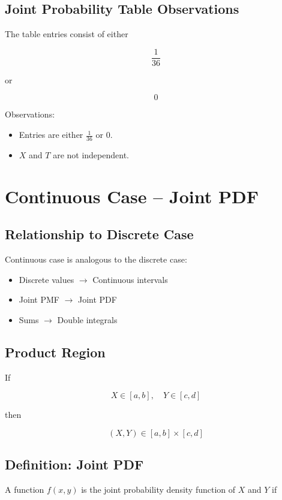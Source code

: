 \documentclass[12pt]{article}
\begin{document}
\subsection{Joint Probability Table Observations}

The table entries consist of either

\[
\frac{1}{36}
\]

or

\[
0
\]

Observations:

\begin{itemize}
\item Entries are either $\frac{1}{36}$ or $0$.
\item $X$ and $T$ are not independent.
\end{itemize}

\section{Continuous Case -- Joint PDF}

\subsection{Relationship to Discrete Case}

Continuous case is analogous to the discrete case:

\begin{itemize}
\item Discrete values $\rightarrow$ Continuous intervals
\item Joint PMF $\rightarrow$ Joint PDF
\item Sums $\rightarrow$ Double integrals
\end{itemize}

\subsection{Product Region}

If

\[
X \in [a,b], \quad Y \in [c,d]
\]

then

\[
(X,Y) \in [a,b] \times [c,d]
\]

\subsection{Definition: Joint PDF}

A function $f(x,y)$ is the joint probability density function of $X$ and $Y$ if
\end{document}
